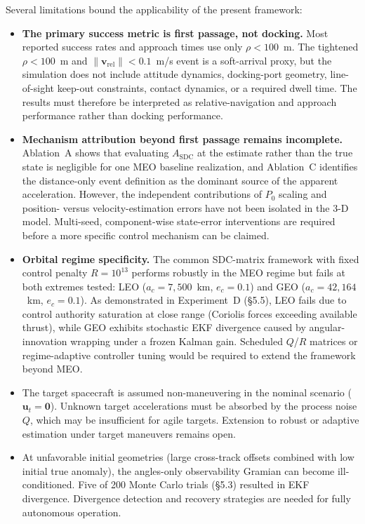 \documentclass[preprint,3p,times]{elsarticle}
\begin{document}
Several limitations bound the applicability of the present framework:
\begin{itemize}
    \item \textbf{The primary success metric is first passage, not docking.} Most reported success rates and approach times use only $\rho < 100$~m. The tightened $\rho < 100$~m and $\|\mathbf{v}_{\text{rel}}\| < 0.1$~m/s event is a soft-arrival proxy, but the simulation does not include attitude dynamics, docking-port geometry, line-of-sight keep-out constraints, contact dynamics, or a required dwell time. The results must therefore be interpreted as relative-navigation and approach performance rather than docking performance.

    \item \textbf{Mechanism attribution beyond first passage remains incomplete.} Ablation~A shows that evaluating $A_{\text{SDC}}$ at the estimate rather than the true state is negligible for one MEO baseline realization, and Ablation~C identifies the distance-only event definition as the dominant source of the apparent acceleration. However, the independent contributions of $P_0$ scaling and position- versus velocity-estimation errors have not been isolated in the 3-D model. Multi-seed, component-wise state-error interventions are required before a more specific control mechanism can be claimed.

    \item \textbf{Orbital regime specificity.} The common SDC-matrix framework with fixed control penalty $R = 10^{13}$ performs robustly in the MEO regime but fails at both extremes tested: LEO ($a_c = 7{,}500$~km, $e_c = 0.1$) and GEO ($a_c = 42{,}164$~km, $e_c = 0.1$). As demonstrated in Experiment~D (§5.5), LEO fails due to control authority saturation at close range (Coriolis forces exceeding available thrust), while GEO exhibits stochastic EKF divergence caused by angular-innovation wrapping under a frozen Kalman gain. Scheduled $Q$/$R$ matrices or regime-adaptive controller tuning would be required to extend the framework beyond MEO.

    \item The target spacecraft is assumed non-maneuvering in the nominal scenario ($\mathbf{u}_t = \mathbf{0}$). Unknown target accelerations must be absorbed by the process noise $Q$, which may be insufficient for agile targets. Extension to robust or adaptive estimation under target maneuvers remains open.

    \item At unfavorable initial geometries (large cross-track offsets combined with low initial true anomaly), the angles-only observability Gramian can become ill-conditioned. Five of 200 Monte Carlo trials (§5.3) resulted in EKF divergence. Divergence detection and recovery strategies are needed for fully autonomous operation.


\end{itemize}
\end{document}
